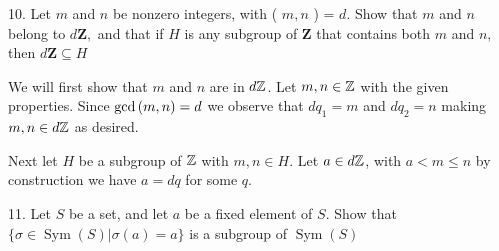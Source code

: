 \newpage%
\begin{mdframed}[style=darkQuesion]
10. Let $m$ and $n$ be nonzero integers, with ( $m, n$ ) = $d$. Show that $m$ and $n$ belong to $d \mathbf{Z},$ and that if $H$ is any subgroup of $\mathbf{Z}$ that contains both $m$ and $n,$ then $d \mathbf{Z} \subseteq H$
\end{mdframed}

\begin{mdframed}[style=darkAnswer,frametitle={Joe Starr}]
We will first show that $m$ and $n$ are in $d\mathbb{Z}$. Let $m,n\in \mathbb{Z}$ with the given
properties. Since $\gcd\left(m,n\right)=d$ we observe that $dq_1=m$ and $dq_2=n$
making $m,n\in d\mathbb{Z}$ as desired.

Next let $H$ be a subgroup of $\mathbb{Z}$ with $m,n\in H$. Let $a\in d\mathbb{Z}$, with
$a<m\leq n$ by construction we have $a=dq$ for some $q$.
\end{mdframed}
\newpage
\begin{mdframed}[style=darkQuesion]
11. Let $S$ be a set, and let $a$ be a fixed element of $S .$ Show that $\{\sigma \in \operatorname{Sym}(S) | \sigma(a)=a\}$ is a subgroup of $\operatorname{Sym}(S)$

\end{mdframed}

